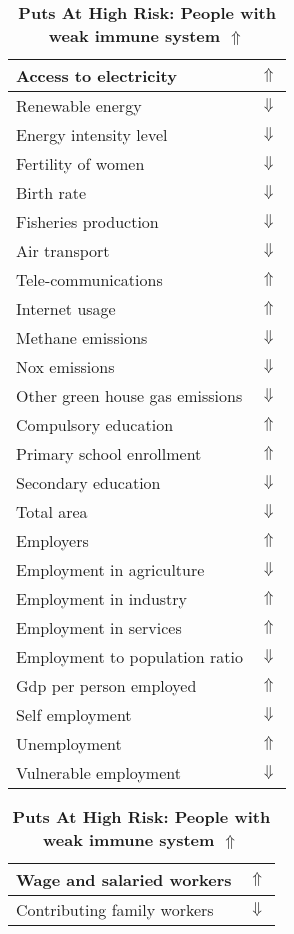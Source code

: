 \documentclass[12pt,notitlepage,oneside]{report}
\begin{document}
\clearpage
\begin{table}[!htb]
\caption{\textbf{Puts At High Risk: People with weak immune system $\Uparrow$}}
\centering
\label{Correlated Socio-economic Factors0}
\begin{tabular}{|l|l|}
\hline
Access to electricity & $\Uparrow$\\ \hline
Renewable energy & $\Downarrow$\\ \hline
Energy intensity level & $\Downarrow$\\ \hline
Fertility of women & $\Downarrow$\\ \hline
Birth rate & $\Downarrow$\\ \hline
Fisheries production & $\Downarrow$\\ \hline
Air transport  & $\Downarrow$\\ \hline
Tele-communications & $\Uparrow$\\ \hline
Internet usage & $\Uparrow$\\ \hline
Methane emissions & $\Downarrow$\\ \hline
Nox emissions & $\Downarrow$\\ \hline
Other green house gas emissions & $\Downarrow$\\ \hline
Compulsory education & $\Uparrow$\\ \hline
Primary school enrollment & $\Uparrow$\\ \hline
Secondary education & $\Downarrow$\\ \hline
Total area & $\Downarrow$\\ \hline
Employers & $\Uparrow$\\ \hline
Employment in agriculture & $\Downarrow$\\ \hline
Employment in industry & $\Uparrow$\\ \hline
Employment in services & $\Uparrow$\\ \hline
Employment to population ratio & $\Downarrow$\\ \hline
Gdp per person employed & $\Uparrow$\\ \hline
Self employment & $\Downarrow$\\ \hline
Unemployment & $\Uparrow$\\ \hline
Vulnerable employment & $\Downarrow$\\ \hline
\end{tabular}
\begin{tabular}{|l|l|}
\hline
Wage and salaried workers & $\Uparrow$\\ \hline
Contributing family workers & $\Downarrow$\\ \hline

\end{tabular}
\end{table}
\end{document}
